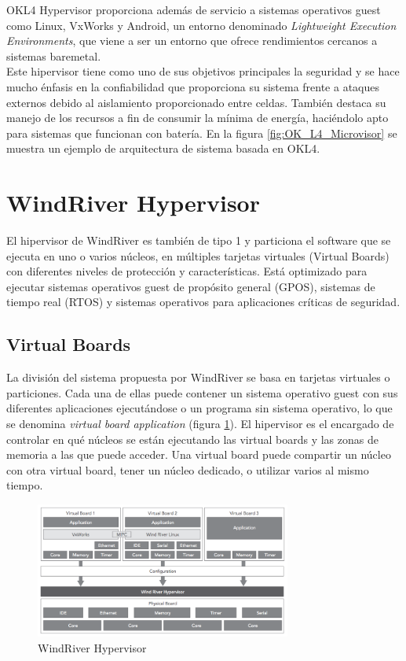 OKL4 Hypervisor proporciona además de servicio a sistemas operativos guest como Linux, VxWorks y Android, un entorno denominado \textit{Lightweight Execution Environments}, que viene a ser un entorno que ofrece rendimientos cercanos a sistemas baremetal.\\
Este hipervisor tiene como uno de sus objetivos principales la seguridad \cite{okl4_2} y se hace mucho énfasis en la confiabilidad que proporciona su sistema frente a ataques externos debido al aislamiento proporcionado entre celdas. También destaca su manejo de los recursos a fin de consumir la mínima de energía, haciéndolo apto para sistemas que funcionan con batería. En la figura \ref{fig:OK_L4_Microvisor} se muestra un ejemplo de arquitectura de sistema basada en OKL4.


\section{WindRiver Hypervisor}
El hipervisor de WindRiver \cite{windriver_1} es también de tipo 1 y particiona el software que se ejecuta en uno o varios núcleos, en múltiples tarjetas virtuales (Virtual Boards) con diferentes niveles de protección y características. Está optimizado para ejecutar sistemas operativos guest de propósito general (\acrshort{GPOS}), sistemas de tiempo real (\acrshort{RTOS}) y sistemas operativos para aplicaciones críticas de seguridad.
\subsection{Virtual Boards}
La división del sistema propuesta por WindRiver se basa en tarjetas virtuales o particiones. Cada una de ellas puede contener un sistema operativo guest con sus diferentes aplicaciones ejecutándose o un programa sin sistema operativo, lo que se denomina \textit{virtual board application} (figura \ref{fig:windriver_hyp}). El hipervisor es el encargado de controlar en qué núcleos se están ejecutando las virtual boards y las zonas de memoria a las que puede acceder. Una virtual board puede compartir un núcleo con otra virtual board, tener un núcleo dedicado, o utilizar varios al mismo tiempo.
\begin{figure}[h]
	\centering
	\includegraphics[width=0.75\textwidth]{recursos/windriver_hyp.png}
	\caption{WindRiver Hypervisor}
	\label{fig:windriver_hyp}
\end{figure}

